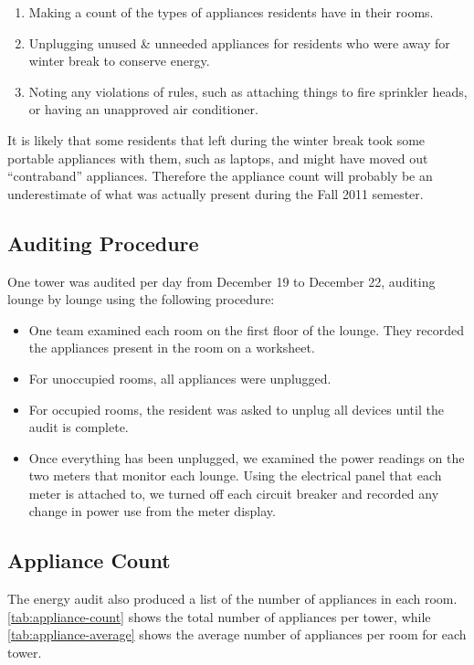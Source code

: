 \begin{enumerate}
\item Making a count of the types of appliances residents have in their rooms.
\item Unplugging unused \& unneeded appliances for residents who were away for winter break to conserve energy.
\item Noting any violations of rules, such as attaching things to fire sprinkler heads, or having an unapproved air conditioner.
\end{enumerate}

It is likely that some residents that left during the winter break took some portable appliances with them, such as laptops, and might have moved out ``contraband'' appliances. Therefore the appliance count will probably be an underestimate of what was actually present during the Fall 2011 semester.


\subsection{Auditing Procedure}

One tower was audited per day from December 19 to December 22, auditing lounge by lounge using the following procedure:

\begin{itemize}
	\item One team examined each room on the first floor of the lounge. They recorded the appliances present in the room on a worksheet.
	\item For unoccupied rooms, all appliances were unplugged.
	\item For occupied rooms, the resident was asked to unplug all devices until the audit is complete.
	\item Once everything has been unplugged, we examined the power readings on the two meters that monitor each lounge. Using the electrical panel that each meter is attached to, we turned off each circuit breaker and recorded any change in power use from the meter display.
\end{itemize}


\subsection{Appliance Count}
\label{sec:appliance-count}

The energy audit also produced a list of the number of appliances in each room. \autoref{tab:appliance-count} shows the total number of appliances per tower, while \autoref{tab:appliance-average} shows the average number of appliances per room for each tower.

